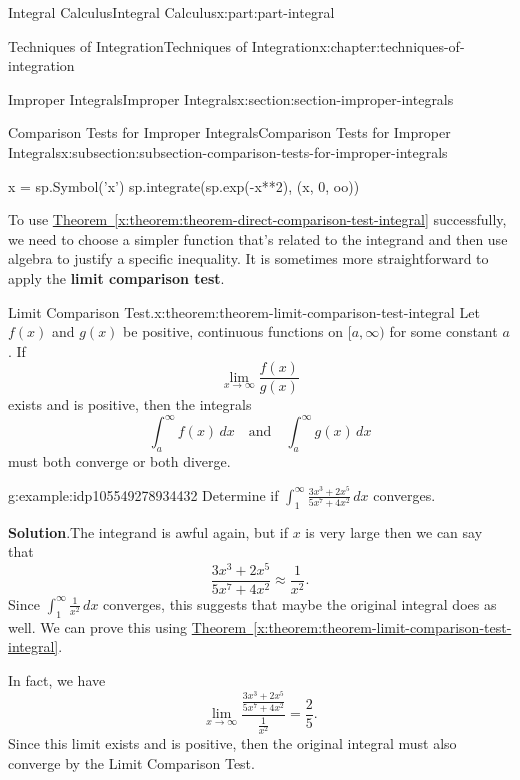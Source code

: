 \documentclass[twoside,10pt,]{book}
\newcommand{\blocktitlefont}{\relax}
\newcommand{\xreffont}{\relax}
\newcommand{\terminology}[1]{\textbf{#1}}
\numberwithin{equation}{part}
\begin{document}
\begin{partptx}{Integral Calculus}{}{Integral Calculus}{}{}{x:part:part-integral}
\begin{chapterptx}{Techniques of Integration}{}{Techniques of Integration}{}{}{x:chapter:techniques-of-integration}
\begin{sectionptx}{Improper Integrals}{}{Improper Integrals}{}{}{x:section:section-improper-integrals}
\begin{subsectionptx}{Comparison Tests for Improper Integrals}{}{Comparison Tests for Improper Integrals}{}{}{x:subsection:subsection-comparison-tests-for-improper-integrals}
\begin{sageinput}
x = sp.Symbol('x')
sp.integrate(sp.exp(-x**2), (x, 0, oo))
\end{sageinput}
To use \hyperref[x:theorem:theorem-direct-comparison-test-integral]{Theorem~{\xreffont\ref{x:theorem:theorem-direct-comparison-test-integral}}} successfully, we need to choose a simpler function that's related to the integrand and then use algebra to justify a specific inequality. It is sometimes more straightforward to apply the \terminology{limit comparison test}.%
\begin{theorem}{Limit Comparison Test.}{}{x:theorem:theorem-limit-comparison-test-integral}%
%
Let \(f(x)\) and \(g(x)\) be positive, continuous functions on \([a,\infty)\) for some constant \(a\). If%
\begin{equation*}
\lim_{x\to\infty}\frac{f(x)}{g(x)}
\end{equation*}
exists and is positive, then the integrals%
\begin{equation*}
\int_{a}^{\infty}f(x)\,dx\quad\text{and}\quad\int_{a}^{\infty}g(x)\,dx
\end{equation*}
must both converge or both diverge.%
\end{theorem}
\begin{example}{}{g:example:idp105549278934432}%
Determine if \(\displaystyle\int_{1}^{\infty}\frac{3x^{3} + 2x^{5}}{5x^{7} + 4x^{2}}\,dx\) converges.%
\par\smallskip%
\noindent\textbf{\blocktitlefont Solution}.\hypertarget{g:solution:idp105549278935328}{}\quad{}The integrand is awful again, but if \(x\) is very large then we can say that%
\begin{equation*}
\frac{3x^{3} + 2x^{5}}{5x^{7} + 4x^{2}} \approx \frac{1}{x^{2}}.
\end{equation*}
Since \(\int_{1}^{\infty}\frac{1}{x^{2}}\,dx\) converges, this suggests that maybe the original integral does as well. We can prove this using \hyperref[x:theorem:theorem-limit-comparison-test-integral]{Theorem~{\xreffont\ref{x:theorem:theorem-limit-comparison-test-integral}}}.%
\par
In fact, we have%
\begin{equation*}
\lim_{x\to\infty}\frac{\frac{3x^{3} + 2x^{5}}{5x^{7} + 4x^{2}}}{\frac{1}{x^{2}}} = \frac{2}{5}.
\end{equation*}
Since this limit exists and is positive, then the original integral must also converge by the Limit Comparison Test.%
\end{example}
\end{subsectionptx}

\end{sectionptx}
\end{chapterptx}
\end{partptx}
\end{document}
